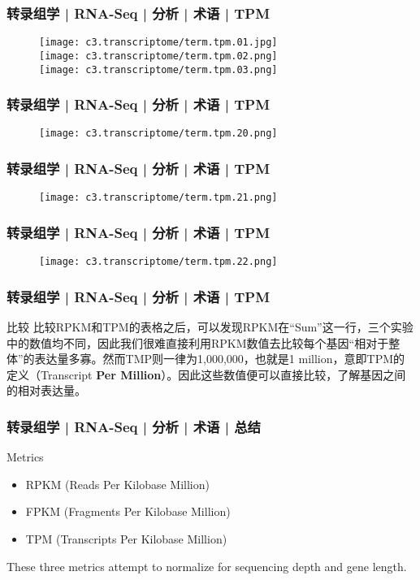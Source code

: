 \begin{frame}
  \frametitle{转录组学 | RNA-Seq | 分析 | 术语 | TPM}
  \begin{figure}
    \centering
    \texttt{[image: c3.transcriptome/term.tpm.01.jpg]}\\
    \texttt{[image: c3.transcriptome/term.tpm.02.png]}\\
    \texttt{[image: c3.transcriptome/term.tpm.03.png]}
  \end{figure}
\end{frame}

\begin{frame}
  \frametitle{转录组学 | RNA-Seq | 分析 | 术语 | TPM}
  \begin{figure}
    \centering
    \texttt{[image: c3.transcriptome/term.tpm.20.png]}
  \end{figure}
\end{frame}

\begin{frame}
  \frametitle{转录组学 | RNA-Seq | 分析 | 术语 | TPM}
  \begin{figure}
    \centering
    \texttt{[image: c3.transcriptome/term.tpm.21.png]}
  \end{figure}
\end{frame}

\begin{frame}
  \frametitle{转录组学 | RNA-Seq | 分析 | 术语 | TPM}
  \begin{figure}
    \centering
    \texttt{[image: c3.transcriptome/term.tpm.22.png]}
  \end{figure}
\end{frame}

\begin{frame}
  \frametitle{转录组学 | RNA-Seq | 分析 | 术语 | TPM}
  \begin{block}{比较}
比较RPKM和TPM的表格之后，可以发现RPKM在“Sum”这一行，三个实验中的数值均不同，因此我们很难直接利用RPKM数值去比较每个基因“相对于整体”的表达量多寡。然而TMP则一律为1,000,000，也就是1 million，意即TPM的定义（Transcript \textbf{Per Million}）。因此这些数值便可以直接比较，了解基因之间的相对表达量。
  \end{block}
\end{frame}

\begin{frame}
  \frametitle{转录组学 | RNA-Seq | 分析 | 术语 | 总结}
  \begin{block}{Metrics}
    \begin{itemize}
      \item RPKM (Reads Per Kilobase Million)
      \item FPKM (Fragments Per Kilobase Million)
      \item TPM (Transcripts Per Kilobase Million)
    \end{itemize}
        These three metrics attempt to normalize for sequencing depth and gene length. 
  \end{block}
\end{frame}

